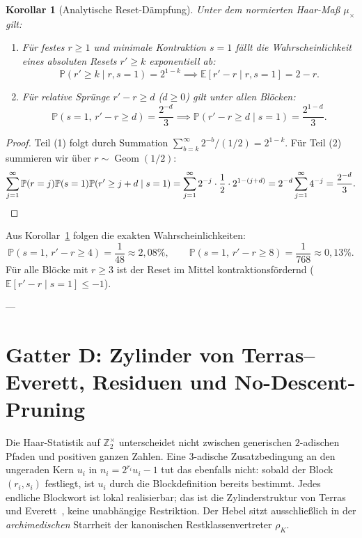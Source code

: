 \documentclass[11pt,reqno]{amsart}
\newtheorem{corollary}[theorem]{Korollar}
\theoremstyle{definition}
\theoremstyle{remark}
\numberwithin{equation}{section}
\begin{document}
\begin{corollary}[Analytische Reset-Dämpfung]
\label{cor:reset_tail}
Unter dem normierten Haar-Maß $\mu_\times$ gilt:
\begin{enumerate}
\item Für festes $r \ge 1$ und minimale Kontraktion $s = 1$ fällt die Wahrscheinlichkeit eines absoluten Resets $r' \ge k$ exponentiell ab:
\begin{equation}
\mathbb{P}(r' \ge k \mid r, s = 1) = 2^{1-k} \implies \mathbb{E}[r' - r \mid r, s = 1] = 2 - r.
\end{equation}
\item Für relative Sprünge $r' - r \ge d$ ($d \ge 0$) gilt unter allen Blöcken:
\begin{equation}
\mathbb{P}(s = 1, \, r' - r \ge d) = \frac{2^{-d}}{3} \implies \mathbb{P}(r' - r \ge d \mid s = 1) = \frac{2^{1-d}}{3}.
\end{equation}
\end{enumerate}
\end{corollary}

\begin{proof}
Teil (1) folgt durch Summation $\sum_{b=k}^\infty 2^{-b} / (1/2) = 2^{1-k}$. 
Für Teil (2) summieren wir über $r \sim \operatorname{Geom}(1/2)$:
\begin{equation*}
\sum_{j=1}^\infty \mathbb{P}(r=j)\mathbb{P}(s=1)\mathbb{P}(r' \ge j+d \mid s=1) = \sum_{j=1}^\infty 2^{-j} \cdot \frac{1}{2} \cdot 2^{1-(j+d)} = 2^{-d} \sum_{j=1}^\infty 4^{-j} = \frac{2^{-d}}{3}. \qedhere
\end{equation*}
\end{proof}

Aus Korollar~\ref{cor:reset_tail} folgen die exakten Wahrscheinlichkeiten:
\begin{equation}
\mathbb{P}(s=1, \, r'-r \ge 4) = \frac{1}{48} \approx 2{,}08\%, \qquad \mathbb{P}(s=1, \, r'-r \ge 8) = \frac{1}{768} \approx 0{,}13\%.
\end{equation}
Für alle Blöcke mit $r \ge 3$ ist der Reset im Mittel kontraktionsfördernd ($\mathbb{E}[r' - r \mid s=1] \le -1$).

---

\section{Gatter D: Zylinder von Terras--Everett, Residuen und No-Descent-Pruning}

Die Haar-Statistik auf $\mathbb{Z}_2^\times$ unterscheidet nicht zwischen generischen $2$-adischen Pfaden und positiven ganzen Zahlen.
Eine $3$-adische Zusatzbedingung an den ungeraden Kern $u_i$ in $n_i=2^{r_i}u_i-1$ tut das ebenfalls nicht:
sobald der Block $(r_i,s_i)$ festliegt, ist $u_i$ durch die Blockdefinition bereits bestimmt.
Jedes endliche Blockwort ist lokal realisierbar; das ist die Zylinderstruktur von Terras und Everett~\cite{Terras1976,Everett1977}, keine unabhängige Restriktion.
Der Hebel sitzt ausschließlich in der \emph{archimedischen} Starrheit der kanonischen Restklassenvertreter $\rho_K$.
\end{document}
